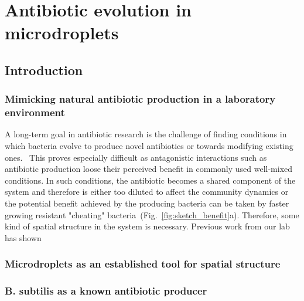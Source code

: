 \part{Antibiotic evolution in microdroplets}
\chapter{Introduction}
\label{chap:droplets_intro}

\section{Mimicking natural antibiotic production in a laboratory environment}
A long-term goal in antibiotic research is the challenge of finding conditions in which bacteria evolve to produce novel antibiotics or towards modifying existing ones.~\cite{Charusanti2012-uy} This proves especially difficult as antagonistic interactions such as antibiotic production loose their perceived benefit in commonly used well-mixed conditions. In such conditions, the antibiotic becomes a shared component of the system and therefore is either too diluted to affect the community dynamics or the potential benefit achieved by the producing bacteria can be taken by faster growing resistant "cheating" bacteria~(Fig.~\ref{fig:sketch_benefit}a). Therefore, some kind of spatial structure in the system is necessary. Previous work from our lab~\cite{Ylaine} has shown 

\section{Microdroplets as an established tool for spatial structure}

\section{B. subtilis as a known antibiotic producer}

